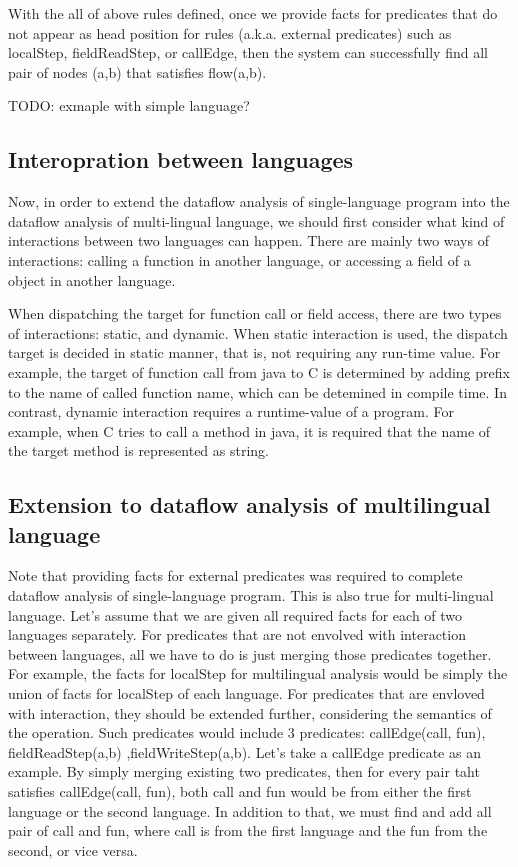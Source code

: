 With the all of above rules defined, once we provide facts for predicates that
do not appear as head position for rules (a.k.a. external predicates) such as localStep, fieldReadStep, or
callEdge, then the system can successfully find all pair of nodes (a,b) that
satisfies flow(a,b).

TODO: exmaple with simple language?

\subsection{Interopration between languages}

Now, in order to extend the dataflow analysis of single-language program into
the dataflow analysis of multi-lingual language, we should first consider what
kind of interactions between two languages can happen. There are mainly two
ways of interactions: calling a function in another language, or accessing a
field of a object in another language.

When dispatching the target for function call or field access,
there are two types of interactions: static, and dynamic. When static interaction is used,
the dispatch target is decided in static manner, that is, not requiring any run-time value.
For example, the target of function call from java to C is determined by adding prefix to
the name of called function name, which can be detemined in compile time. In contrast,
dynamic interaction requires a runtime-value of a program. For example, when C tries to call
a method in java, it is required that the name of the target method is represented as string.

\subsection{Extension to dataflow analysis of multilingual language}

Note that providing facts for external predicates was required to complete
dataflow analysis of single-language program.  This is also true for
multi-lingual language. Let's assume that we are given all required facts for
each of two languages separately. For predicates that are not envolved with interaction
between languages, all we have to do is just merging those predicates together. For example,
the facts for localStep for multilingual analysis would be simply the union of facts for localStep
of each language. For predicates that are envloved with interaction, they should be extended further,
considering the semantics of the operation. Such predicates would include 3 predicates:
callEdge(call, fun), fieldReadStep(a,b) ,fieldWriteStep(a,b). Let's take a callEdge predicate as an
example. By simply merging existing two predicates, then for every pair taht satisfies callEdge(call, fun),
both call and fun would be from either the first language or the second language. In addition to that,
we must find and add all pair of call and fun, where call is from the first language and the fun from the second,
or vice versa.

